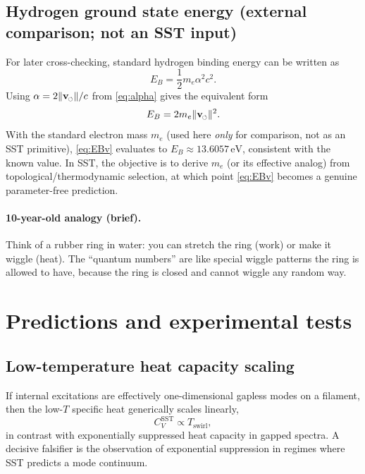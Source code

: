 \documentclass[pdflatex,sn-mathphys-num]{revtex4-2}
\newcommand{\swirlarrow}{\mathchoice{\mkern-2mu\scriptstyle\boldsymbol{\circlearrowleft}}{\mkern-2mu\scriptstyle\boldsymbol{\circlearrowleft}}{\mkern-2mu\scriptscriptstyle\boldsymbol{\circlearrowleft}}{\mkern-2mu\scriptscriptstyle\boldsymbol{\circlearrowleft}}}
\newcommand{\vswirl}{\mathbf{v}_{\swirlarrow}}
\newcommand{\vnorm}{\lVert \vswirl \rVert}
\newcommand{\clight}{c}
\begin{document}
    \subsection{Hydrogen ground state energy (external comparison; not an SST input)}
        For later cross-checking, standard hydrogen binding energy can be written as
        \begin{equation}
            E_B = \frac{1}{2}m_e \alpha^2 \clight^2.
        \end{equation}
        Using \(\alpha=2\vnorm/\clight\) from \eqref{eq:alpha} gives the equivalent form
        \begin{equation}
            E_B = 2 m_e \vnorm^2.
            \label{eq:EBv}
        \end{equation}
        With the standard electron mass \(m_e\) (used here \emph{only} for comparison, not as an SST primitive),
        \eqref{eq:EBv} evaluates to \(E_B \approx 13.6057\,\mathrm{eV}\), consistent with the known value.
        In SST, the objective is to derive \(m_e\) (or its effective analog) from topological/thermodynamic selection,
        at which point \eqref{eq:EBv} becomes a genuine parameter-free prediction.

        \paragraph{10-year-old analogy (brief).}
            Think of a rubber ring in water: you can stretch the ring (work) or make it wiggle (heat). The ``quantum numbers''
            are like special wiggle patterns the ring is allowed to have, because the ring is closed and cannot wiggle any random way.

    \section{Predictions and experimental tests}

    \subsection{Low-temperature heat capacity scaling}
        If internal excitations are effectively one-dimensional gapless modes on a filament,
        then the low-\(T\) specific heat generically scales linearly,
        \begin{equation}
            C_V^{\text{SST}} \propto T_{\text{swirl}},
            \label{eq:CVlinear}
        \end{equation}
        in contrast with exponentially suppressed heat capacity in gapped spectra.
        A decisive falsifier is the observation of exponential suppression in regimes where SST predicts a mode continuum.
\end{document}
